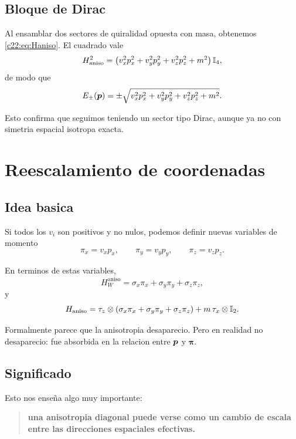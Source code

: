 \subsection{Bloque de Dirac}
Al ensamblar dos sectores de quiralidad opuesta con masa, obtenemos \eqref{c22:eq:Haniso}. El cuadrado vale
\begin{equation}
H_{\mathrm{aniso}}^2
=
\left(v_x^2 p_x^2 + v_y^2 p_y^2 + v_z^2 p_z^2 + m^2\right)\mathbb{I}_4,
\end{equation}
de modo que
\begin{equation}
E_\pm(\bm{p})=\pm\sqrt{v_x^2 p_x^2 + v_y^2 p_y^2 + v_z^2 p_z^2 + m^2}.
\label{c22:eq:DiracDispersionAniso}
\end{equation}

Esto confirma que seguimos teniendo un sector tipo Dirac, aunque ya no con simetria espacial isotropa exacta.

\section{Reescalamiento de coordenadas}
\subsection{Idea basica}
Si todos los \(v_i\) son positivos y no nulos, podemos definir nuevas variables de momento
\begin{equation}
\pi_x=v_x p_x,\qquad
\pi_y=v_y p_y,\qquad
\pi_z=v_z p_z.
\label{c22:eq:piVariables}
\end{equation}

En terminos de estas variables,
\begin{equation}
H_W^{\mathrm{aniso}}
=
\sigma_x \pi_x + \sigma_y \pi_y + \sigma_z \pi_z,
\end{equation}
y
\begin{equation}
H_{\mathrm{aniso}}
=
\tau_z\otimes(\sigma_x\pi_x+\sigma_y\pi_y+\sigma_z\pi_z)
+m\,\tau_x\otimes\mathbb{I}_2.
\end{equation}

Formalmente parece que la anisotropia desaparecio. Pero en realidad no desaparecio: fue absorbida en la relacion entre \(\bm{p}\) y \(\bm{\pi}\).

\subsection{Significado}
Esto nos enseña algo muy importante:
\begin{quote}
\textbf{una anisotropia diagonal puede verse como un cambio de escala entre las direcciones espaciales efectivas.}
\end{quote}

